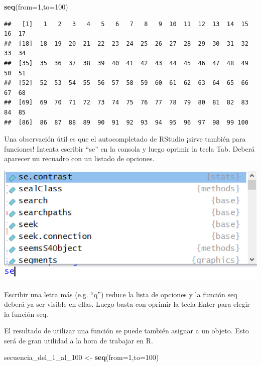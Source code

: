 \documentclass[]{book}
\newenvironment{Shaded}{\begin{snugshade}}{\end{snugshade}}
\newcommand{\KeywordTok}[1]{\textcolor[rgb]{0.13,0.29,0.53}{\textbf{#1}}}
\newcommand{\DataTypeTok}[1]{\textcolor[rgb]{0.13,0.29,0.53}{#1}}
\newcommand{\DecValTok}[1]{\textcolor[rgb]{0.00,0.00,0.81}{#1}}
\newcommand{\StringTok}[1]{\textcolor[rgb]{0.31,0.60,0.02}{#1}}
\newcommand{\NormalTok}[1]{#1}
\theoremstyle{definition}
\theoremstyle{definition}
\theoremstyle{definition}
\theoremstyle{remark}
\begin{document}
\begin{Shaded}
\begin{Highlighting}[]
\KeywordTok{seq}\NormalTok{(}\DataTypeTok{from=}\DecValTok{1}\NormalTok{,}\DataTypeTok{to=}\DecValTok{100}\NormalTok{)}
\end{Highlighting}
\end{Shaded}

\begin{verbatim}
##   [1]   1   2   3   4   5   6   7   8   9  10  11  12  13  14  15  16  17
##  [18]  18  19  20  21  22  23  24  25  26  27  28  29  30  31  32  33  34
##  [35]  35  36  37  38  39  40  41  42  43  44  45  46  47  48  49  50  51
##  [52]  52  53  54  55  56  57  58  59  60  61  62  63  64  65  66  67  68
##  [69]  69  70  71  72  73  74  75  76  77  78  79  80  81  82  83  84  85
##  [86]  86  87  88  89  90  91  92  93  94  95  96  97  98  99 100
\end{verbatim}

Una observación útil es que el autocompletado de RStudio ¡sirve también
para funciones! Intenta escribir ``se'' en la consola y luego oprimir la
tecla Tab. Deberá aparecer un recuadro con un listado de opciones.

\includegraphics[width=6.49in]{./imagenes/2_function_tab}

Escribir una letra más (e.g. ``q'') reduce la lista de opciones y la
función seq deberá ya ser visible en ellas. Luego basta con oprimir la
tecla Enter para elegir la función seq.

El resultado de utilizar una función se puede también asignar a un
objeto. Esto será de gran utilidad a la hora de trabajar en R.

\begin{Shaded}
\begin{Highlighting}[]
\NormalTok{secuencia_del_1_al_}\DecValTok{100}\NormalTok{ <-}\StringTok{ }\KeywordTok{seq}\NormalTok{(}\DataTypeTok{from=}\DecValTok{1}\NormalTok{,}\DataTypeTok{to=}\DecValTok{100}\NormalTok{)}
\end{Highlighting}
\end{Shaded}
\end{document}
